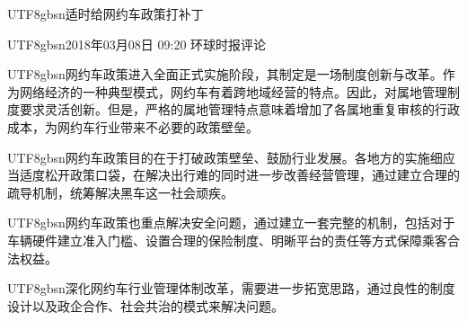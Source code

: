 \documentclass[11pt]{article}
\newcommand{\zh}[1]{\begin{CJK*}{UTF8}{gbsn}#1\end{CJK*}}
\begin{document}
\begin{minipage}{\linewidth}

\zh{适时给网约车政策打补丁}\newline

\noindent\zh{2018年03月08日 09:20 环球时报评论}\newline

\zh{网约车政策进入全面正式实施阶段，其制定是一场制度创新与改革。作为网络经济的一种典型模式，网约车有着跨地域经营的特点。因此，对属地管理制度要求灵活创新。但是，严格的属地管理特点意味着增加了各属地重复审核的行政成本，为网约车行业带来不必要的政策壁垒。}

\zh{网约车政策目的在于打破政策壁垒、鼓励行业发展。各地方的实施细应当适度松开政策口袋，在解决出行难的同时进一步改善经营管理，通过建立合理的疏导机制，统筹解决黑车这一社会顽疾。}

\zh{网约车政策也重点解决安全问题，通过建立一套完整的机制，包括对于车辆硬件建立准入门槛、设置合理的保险制度、明晰平台的责任等方式保障乘客合法权益。}

\zh{深化网约车行业管理体制改革，需要进一步拓宽思路，通过良性的制度设计以及政企合作、社会共治的模式来解决问题。}

\end{minipage}
\end{document}
